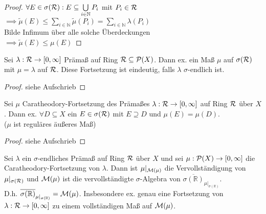 \documentclass[11pt,a4paper,fleqn,openany]{report}
\begin{document}
    \begin{proof}
      $\forall E \in \sigma(\mathcal{R}): E \subseteq \bigcup\limits_{i \in \mathbb{N}} P_i$ mit $P_i \in \mathcal{R}$\\
      $\implies \tilde{\mu}(E) \leq \sum\limits_{i \in \mathbb{N}} \tilde{\mu}(P_i) = \sum\limits_{i \in \mathbb{N}} \lambda(P_i)$\\
      Bilde Infimum über alle solche Überdeckungen\\
      $\implies \tilde{\mu}(E) \leq \mu(E)$ 
    \end{proof}


    \begin{theorem}[Im Aufschrieb II.14]
      Sei $\lambda: \mathcal{R} \to [0, \infty]$ Prämaß auf Ring $\mathcal{R}\subseteq \mathcal{P}(X)$. Dann ex. ein Maß $\mu$ auf $\sigma(\mathcal{R})$ mit $\mu=\lambda$ auf $\mathcal{R}$. Diese Fortsetzung ist eindeutig, falls $\lambda$ $\sigma$-endlich ist.
    \end{theorem}

    \begin{proof}
      siehe Aufschrieb
    \end{proof}

    \begin{theorem}
      Sei $\mu$ Caratheodory-Fortsetzung des Prämaßes $\lambda: \mathcal{R} \to [0,\infty]$ auf Ring $\mathcal{R}$ über $X$. Dann ex. $\forall D \subseteq X$ ein $E \in \sigma(\mathcal{R})$ mit $E \supseteq D$ und $\mu(E) = \mu(D)$.\\
      ($\mu$ ist \glqq reguläres \grqq äußeres Maß)
    \end{theorem}

    \begin{proof}
      siehe Aufschrieb
    \end{proof}

    \begin{theorem}[i.A. II.16]
      Sei $\lambda$ ein $\sigma$-endliches Prämaß auf Ring $\mathcal{R}$ über $X$ und sei $\mu: \mathcal{P}(X) \to [0,\infty]$ die Caratheodory-Fortsetzung von $\lambda$. Dann ist $\mu|_{\mathcal{M}(\mu)}$ die Vervollständigung von $\mu|_{\sigma(\mathcal{R})}$ und $\mathcal{M}(\mu)$ ist die vervollständigte $\sigma$-Algebra von $\overline{\sigma(\mathbb{R})}_{\mu|_{\sigma(\mathbb{R})}}$.\\
      D.h. $\overline{\sigma(\mathbb{R})}_{\mu|_{\sigma(\mathbb{R})}} = \mathcal{M}(\mu)$. Insbesondere ex. genau eine Fortsetzung von $\lambda: \mathcal{R} \to [0, \infty]$ zu einem vollständigen Maß auf $\mathcal{M}(\mu)$.
    \end{theorem}
\end{document}
